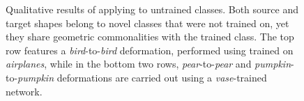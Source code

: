 \documentclass[acmtog,timestamp]{acmart}%
\newcommand{\jsubfig}[2]{%
	\sbox\jsavebox{#1}%
	\parbox[t]{\wd\jsavebox}{\centering\usebox\jsavebox\\#2}%
	}
\begin{document}
\begin{figure}[h]
    
\caption{
Qualitative results of applying \ourmethod{} to untrained classes. 
Both source and target shapes belong to novel classes that were not trained on, yet they share geometric commonalities with the trained class.
The top row features a \emph{bird}-to-\emph{bird} deformation, performed using \ourmethod{} trained on \emph{airplanes}, while in the bottom two rows, \emph{pear}-to-\emph{pear} and \emph{pumpkin}-to-\emph{pumpkin} deformations are carried out using a \emph{vase}-trained network.}
\label{fig:novel_novel_class}
\end{figure}\begin{comment}
    \jsubfig{\texttt{[image: \{figures/novel\_novel\_class/bat1bat2/sample002\_source.png]}}}{}%
    \hfill \jsubfig{\texttt{[image: figures/novel\_novel\_class/bat1bat2/sample002\_target.png]}}{}%
    \hfill \jsubfig{\texttt{[image: figures/novel\_novel\_class/bat1bat2/sample002\_targetPred.png]}}{}%
    
    
    \jsubfig{\texttt{[image: figures/novel\_novel\_class/bird1bird3/sample001\_source.png]}}{}%
    \hfill \jsubfig{\texttt{[image: figures/novel\_novel\_class/bird1bird3/sample001\_target.png]}}{}%
    \hfill \jsubfig{\texttt{[image: figures/novel\_novel\_class/bird1bird3/sample001\_targetPred.png]}}{}%
    \\
	\jsubfig{\texttt{[image: \{figures/novel\_class/line.png]}}}{}%
	\\
    \jsubfig{\texttt{[image: figures/novel\_novel\_class/pear6pear7/sample002\_source.png]}}{}%
    \hfill \jsubfig{\texttt{[image: figures/novel\_novel\_class/pear6pear7/sample002\_target.png]}}{}%
    \hfill \jsubfig{\texttt{[image: figures/novel\_novel\_class/pear6pear7/sample002\_targetPred.png]}}{}%
    
    \jsubfig{\texttt{[image: figures/novel\_novel\_class/pumpkin1pumpkin3/sample001\_source.png]}}{}%
    \hfill \jsubfig{\texttt{[image: figures/novel\_novel\_class/pumpkin1pumpkin3/sample001\_target.png]}}{}%
    \hfill \jsubfig{\texttt{[image: figures/novel\_novel\_class/pumpkin1pumpkin3/sample001\_targetPred.png]}}{}%
\end{comment}\begin{comment}


\end{comment}
\end{document}
